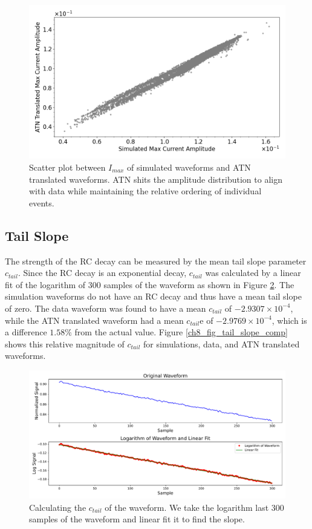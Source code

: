 \begin{figure}%
\centering
\includegraphics[width=0.9\linewidth,trim={0pc 0pc 0pc 0pc},clip]{ch8/figs/SEP_scatter_current_amplitude.png}
\caption{Scatter plot between $I_{max}$ of simulated waveforms and ATN translated waveforms. ATN shits the amplitude distribution to align with data while maintaining the relative ordering of individual events.}
\label{fig:current_amp}
\end{figure}


\subsection{Tail Slope}
The strength of the RC decay can be measured by the mean tail slope parameter $c_{tail}$. Since the RC decay is an exponential decay, $c_{tail}$ was calculated by a linear fit of the logarithm of 300 samples of the waveform as shown in Figure \ref{ch8_fig_tail_slope_calc}. The simulation waveforms do not have an RC decay and thus have a mean tail slope of zero. The data waveform was found to have a mean $c_{tail}$ of $-2.9307\times10^{-4}$, while the ATN translated waveform had a mean $c_{tail}$e of $-2.9769\times10^{-4}$, which is a difference $1.58\%$ from the actual value. Figure \ref{ch8_fig_tail_slope_comp} shows this relative magnitude of $c_{tail}$ for simulations, data, and ATN translated waveforms. 

\begin{figure}%
    \centering
    \includegraphics[width=0.99\linewidth, trim={0.4cm 0pc 0.3cm 0cm},clip]{ch8/figs/tail_slope_calc.pdf}
    \caption{Calculating the $c_{tail}$ of the waveform. We take the logarithm last 300 samples of the waveform and linear fit it to find the slope.}
    \label{ch8_fig_tail_slope_calc}
\end{figure}


